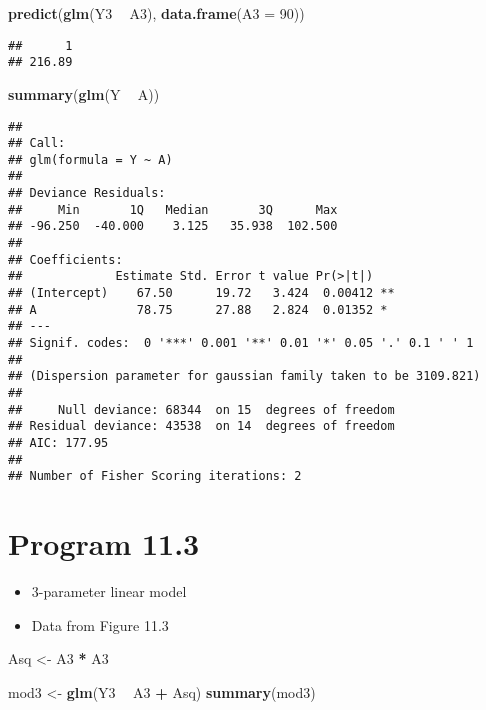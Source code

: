 \documentclass[
  10pt,
]{book}
\newenvironment{Shaded}{\begin{snugshade}}{\end{snugshade}}
\newcommand{\DataTypeTok}[1]{\textcolor[rgb]{0.13,0.29,0.53}{#1}}
\newcommand{\DecValTok}[1]{\textcolor[rgb]{0.00,0.00,0.81}{#1}}
\newcommand{\KeywordTok}[1]{\textcolor[rgb]{0.13,0.29,0.53}{\textbf{#1}}}
\newcommand{\NormalTok}[1]{#1}
\newcommand{\OperatorTok}[1]{\textcolor[rgb]{0.81,0.36,0.00}{\textbf{#1}}}
\newcommand{\StringTok}[1]{\textcolor[rgb]{0.31,0.60,0.02}{#1}}
\providecommand{\tightlist}{%
  \setlength{\itemsep}{0pt}\setlength{\parskip}{0pt}}
\begin{document}
\begin{Shaded}
\begin{Highlighting}[]
\KeywordTok{predict}\NormalTok{(}\KeywordTok{glm}\NormalTok{(Y3 }\OperatorTok{~}\StringTok{ }\NormalTok{A3), }\KeywordTok{data.frame}\NormalTok{(}\DataTypeTok{A3 =} \DecValTok{90}\NormalTok{))}
\end{Highlighting}
\end{Shaded}

\begin{verbatim}
##      1 
## 216.89
\end{verbatim}

\begin{Shaded}
\begin{Highlighting}[]
\KeywordTok{summary}\NormalTok{(}\KeywordTok{glm}\NormalTok{(Y }\OperatorTok{~}\StringTok{ }\NormalTok{A))}
\end{Highlighting}
\end{Shaded}

\begin{verbatim}
## 
## Call:
## glm(formula = Y ~ A)
## 
## Deviance Residuals: 
##     Min       1Q   Median       3Q      Max  
## -96.250  -40.000    3.125   35.938  102.500  
## 
## Coefficients:
##             Estimate Std. Error t value Pr(>|t|)   
## (Intercept)    67.50      19.72   3.424  0.00412 **
## A              78.75      27.88   2.824  0.01352 * 
## ---
## Signif. codes:  0 '***' 0.001 '**' 0.01 '*' 0.05 '.' 0.1 ' ' 1
## 
## (Dispersion parameter for gaussian family taken to be 3109.821)
## 
##     Null deviance: 68344  on 15  degrees of freedom
## Residual deviance: 43538  on 14  degrees of freedom
## AIC: 177.95
## 
## Number of Fisher Scoring iterations: 2
\end{verbatim}

\hypertarget{program-11.3}{%
\section{Program 11.3}\label{program-11.3}}

\begin{itemize}
\tightlist
\item
  3-parameter linear model
\item
  Data from Figure 11.3
\end{itemize}

\begin{Shaded}
\begin{Highlighting}[]
\NormalTok{Asq <-}\StringTok{ }\NormalTok{A3 }\OperatorTok{*}\StringTok{ }\NormalTok{A3}

\NormalTok{mod3 <-}\StringTok{ }\KeywordTok{glm}\NormalTok{(Y3 }\OperatorTok{~}\StringTok{ }\NormalTok{A3 }\OperatorTok{+}\StringTok{ }\NormalTok{Asq)}
\KeywordTok{summary}\NormalTok{(mod3)}
\end{Highlighting}
\end{Shaded}
\end{document}

